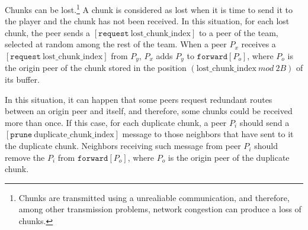
\label{sec:routes_discovery}

Chunks can be lost.\footnote{Chunks are transmitted using a
  unrealiable communication, and therefore, among other transmission
  problems, network congestion can produce a loss of chunks.} A chunk
is considered as lost when it is time to send it to the player and the
chunk has not been received.  In this situation, for each lost chunk,
the peer sends a $[\mathtt{request}~\text{lost\_chunk\_index}]$ to a
peer of the team, selected at random among the rest of the team. When
a peer $P_x$ receives a $[\mathtt{request}~\text{lost\_chunk\_index}]$
from $P_y$, $P_x$ adds $P_y$ to $\mathtt{forward}[P_o]$, where $P_o$ is
the origin peer of the chunk stored in the position
$(\text{lost\_chunk\_index}~\mathit{mod}~2B)$ of its buffer.

\begin{comment}
origin peer of the next chunk stored in the
buffer. This peer has to characteristics: (1) it is not necessary a
neighbor peer, and (2) there is a high probability that this chunk has
been stored in the buffer ``for a long time'', so, if it is not a
neighbor, the link between it and the peer is working fairly well.
\end{comment}

  
In this situation, it can happen that some peers request redundant
routes between an origin peer and itself, and therefore, some chunks
could be received more than once. If this case, for each duplicate
chunk, a peer $P_i$ should send a
$[\mathtt{prune}~\text{duplicate\_chunk\_index}]$ message to those
neighbors that have sent to it the duplicate chunk. Neighbors
receiving such message from peer $P_i$ should remove the $P_i$ from
$\mathtt{forward}[P_o]$, where $P_o$ is the origin peer of the duplicate
chunk.

